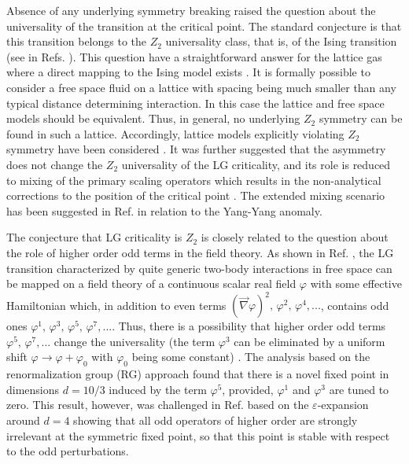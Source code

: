 \documentclass[prb,aps,twocolumn,groupedaddress,floats,showpacs,final]{revtex4}
\begin{document}
 Absence of any underlying symmetry breaking raised the question about the universality of the transition at the critical point. The standard conjecture is that this transition belongs to  the $Z_2$ universality class, that is, of the Ising transition (see in Refs. \cite{Landau,Kadanoff,Patashin}). 
This question have a straightforward answer for the lattice gas where a direct mapping to the Ising model exists \cite{Lee}. It is formally possible to consider a free space fluid on a lattice with spacing being much smaller than any typical distance determining  interaction. In this case the lattice and free space models should be equivalent. Thus,  in general, no underlying $Z_2$ symmetry can be found in such a lattice. Accordingly, lattice models explicitly violating $Z_2$ symmetry have been considered \cite{Mermin_PRL}. 
 It was further suggested that the asymmetry does not change the $Z_2$ universality of the LG criticality, and its role  is reduced to mixing of the primary scaling operators which results in the non-analytical corrections to the position of the critical point \cite{Mermin,Pokrovskii,Patashin,Bruce,Wilding}.  The extended mixing scenario has been suggested in Ref.\cite{Fisher2000,Fisher_2001,Fisher_2003,Fisher_2003_2} in relation to the  Yang-Yang anomaly.

 The conjecture  that LG criticality is $Z_2$ is closely related to the question about the role of higher order odd terms in the field theory. As shown in Ref. \cite{Hubbard}, the LG transition characterized by quite generic two-body interactions in free space can be mapped on a field theory of a continuous scalar real field    $\varphi$ with some effective Hamiltonian which, in addition to even terms $(\vec{\nabla} \varphi)^2,\, \varphi^2, \, \varphi^4,...$, contains 
odd ones $\varphi^1, \, \varphi^3, \, \varphi^5,\, \varphi^7, ...$. 
Thus, there is a possibility that higher order odd  terms $\varphi^5,\, \varphi^7, ...$  change the universality (the term $\varphi^3$ can be eliminated by a uniform shift $\varphi \to \varphi + \varphi_0$ with $\varphi_0$ being some constant) \cite{SMA}.  
The analysis \cite{Hertz} based on the renormalization group (RG) approach  found that there is a novel fixed point in dimensions $d=10/3$ induced by the term $\varphi^5$, provided, $\varphi^1 $ and $\varphi^3$ are tuned to zero.
This result, however, was challenged in Ref. \cite{Nicoll} based on the $\varepsilon$-expansion around $d=4$ showing that all odd operators of higher order are strongly irrelevant at the symmetric fixed point, so that this point is stable with respect to the odd perturbations. 
\end{document}

